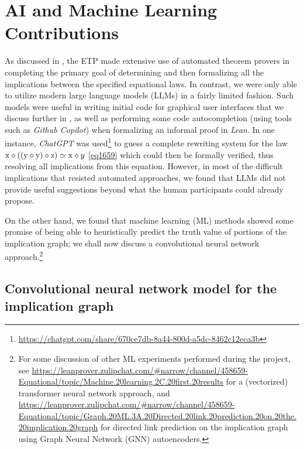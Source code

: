 \section{AI and Machine Learning Contributions}\label{ml-sec}

As discussed in , the ETP made extensive use of automated theorem provers in completing the primary goal of determining and then formalizing all the implications between the specified equational laws.  In contrast, we were only able to utilize modern large language models (LLMs) in a fairly limited fashion.  Such models were useful in writing initial code for graphical user interfaces that we discuss further in , as well as performing some code autocompletion (using tools such as \emph{Github Copilot}) when formalizing an informal proof in \emph{Lean}.  In one instance, \emph{ChatGPT} was used\footnote{\url{https://chatgpt.com/share/670ce7db-8a44-800d-a5dc-8462c12eca3b}} to guess a complete rewriting system for the law $\mathrm{x} \diamond ((\mathrm{y} \diamond \mathrm{y}) \diamond \mathrm{z}) \simeq \mathrm{x} \diamond y$ \eqref{eq1659} which could then be formally verified, thus resolving all implications from this equation. However, in most of the difficult implications that resisted automated approaches, we found that LLMs did not provide useful suggestions beyond what the human participants could already propose.

On the other hand, we found that machine learning (ML) methods showed some promise of being able to heuristically predict the truth value of portions of the implication graph; we shall now discuss a convolutional neural network approach.\footnote{For some discussion of other ML experiments performed during the project, see \url{https://leanprover.zulipchat.com/\#narrow/channel/458659-Equational/topic/Machine.20learning.2C.20first.20results} for a (vectorized) transformer neural network approach, and \url{https://leanprover.zulipchat.com/\#narrow/channel/458659-Equational/topic/Graph.20ML.3A.20Directed.20link.20prediction.20on.20the.20implication.20graph} for directed link prediction on the implication graph using Graph Neural Network (GNN) autoencoders.}

\subsection{Convolutional neural network model for the implication graph}

